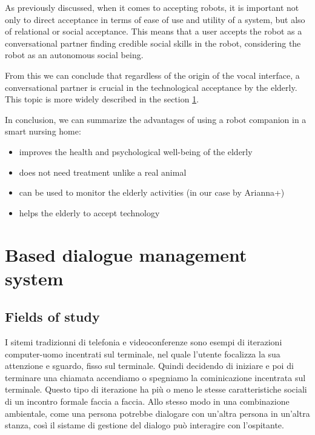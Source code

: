 \documentclass{thesisreport}
\begin{document}
 As previously discussed, when it comes to accepting robots, it is important not only to direct acceptance in terms of ease of use and utility of a system, but also of relational or social acceptance. This means that a user accepts the robot as a conversational partner finding credible social skills in the robot, considering the robot as an autonomous social being. 
 
 From this we can conclude that regardless of the origin of the vocal interface, a conversational partner is crucial in the technological acceptance by the elderly. This topic is more widely described in the section \ref{speech}.
 
 In conclusion, we can summarize the advantages of using a robot companion in a smart nursing home:
 \begin{itemize}
     \item improves the health and psychological well-being of the elderly
     \item does not need treatment unlike a real animal
     \item can be used to monitor the elderly activities (in our case by Arianna+)
     \item helps the elderly to accept technology
 \end{itemize}

 \section{Based dialogue management system} \label{speech}
 \subsection{Fields of study}
 I sitemi tradizionni di telefonia e videoconferenze sono esempi di iterazioni computer-uomo incentrati sul terminale, nel quale l'utente focalizza la sua attenzione e sguardo, fisso sul terminale. Quindi decidendo di iniziare e poi di terminare una chiamata accendiamo o spegniamo la cominicazione incentrata sul terminale. Questo tipo di iterazione ha più o meno le stesse caratteristiche sociali di un incontro formale faccia a faccia. 
 Allo stesso modo in una combinazione ambientale, come una persona potrebbe dialogare con un'altra persona in un'altra stanza, così il sistame di gestione del dialogo può interagire con l'ospitante. 
 
\end{document}
